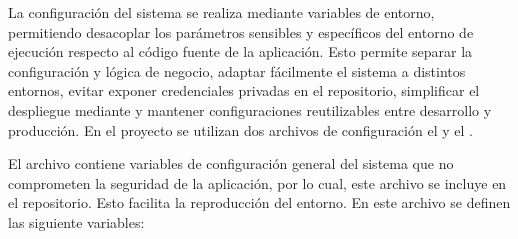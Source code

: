 
La configuración del sistema se realiza mediante variables de entorno, permitiendo desacoplar los parámetros sensibles y específicos del entorno de ejecución respecto al código fuente de la aplicación. Esto permite separar la configuración y lógica de negocio, adaptar fácilmente el sistema a distintos entornos, evitar exponer credenciales privadas en el repositorio, simplificar el despliegue mediante  y mantener configuraciones reutilizables entre desarrollo y producción. En el proyecto se utilizan dos archivos de configuración el  y el .

El archivo  contiene variables de configuración general del sistema que no comprometen la seguridad de la aplicación, por lo cual, este archivo se incluye en el repositorio. Esto facilita la reproducción del entorno. En este archivo se definen las siguiente variables:

